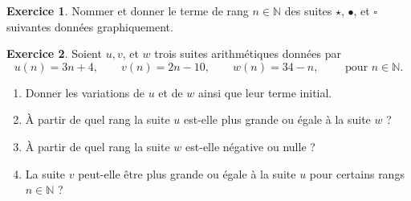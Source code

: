 \documentclass[12pt]{paper}
\theoremstyle{plain}
\theoremstyle{definition}
\newtheorem{ex}{Exercice}
\newcommand{\N}{\mathbb{N}}
\begin{document}
\begin{ex}

Nommer et donner le terme de rang $n \in \N$ des suites $\star$, $\bullet$, et $\square$ suivantes données graphiquement.

\begin{center}
\end{center}

\end{ex}

\begin{ex}
	Soient $u, v$, et $w$ trois suites arithmétiques données par
		\[ u(n ) = 3n + 4, \qquad v(n) = 2n -10, \qquad w(n) = 34 - n, \qquad \text{ pour } n \in \N.\]
	\begin{enumerate}
		\item Donner les variations de $u$ et de $w$ ainsi que leur terme initial.
		\item À partir de quel rang la suite $u$ est-elle plus grande ou égale à la suite $w$ ?
		\item À partir de quel rang la suite $w$ est-elle négative ou nulle ?
		\item La suite $v$ peut-elle être plus grande ou égale à la suite $u$ pour certains rangs $n\in\N$ ?
	\end{enumerate}
\end{ex}
\end{document}
